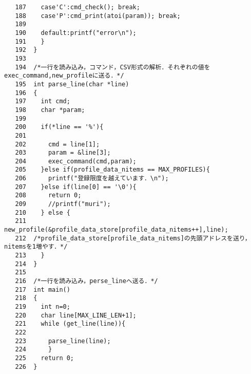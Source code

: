 \documentclass[a4j]{jarticle}
\begin{document}
{\begin{verbatim}
   187	  case'C':cmd_check(); break;
   188	  case'P':cmd_print(atoi(param)); break;
   189			   
   190	  default:printf("error\n");
   191	  }
   192	}
   193	
   194	/*一行を読み込み，コマンド，CSV形式の解析．それぞれの値をexec_command,new_profileに送る．*/
   195	int parse_line(char *line)
   196	{
   197	  int cmd;
   198	  char *param;
   199	  
   200	  if(*line == '%'){
   201	
   202	    cmd = line[1];
   203	    param = &line[3];
   204	    exec_command(cmd,param);
   205	  }else if(profile_data_nitems == MAX_PROFILES){
   206	    printf("登録限度を越えています．\n");
   207	  }else if(line[0] == '\0'){
   208	    return 0;
   209	    //printf("muri");
   210	  } else {
   211	    new_profile(&profile_data_store[profile_data_nitems++],line);
   212	/*profile_data_store[profile_data_nitems]の先頭アドレスを送り，nitemsを1増やす．*/
   213	  }
   214	}
   215	
   216	/*一行を読み込み，perse_lineへ送る．*/
   217	int main()
   218	{
   219	  int n=0;
   220	  char line[MAX_LINE_LEN+1];
   221	  while (get_line(line)){
   222	    
   223	    parse_line(line);
   224	    }
   225	  return 0;
   226	}

\end{verbatim}
}
\end{document}
